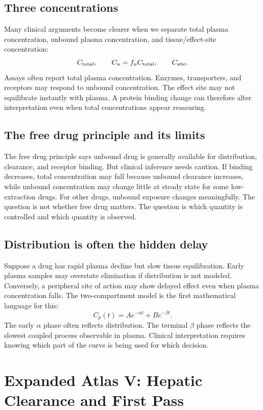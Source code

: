 \subsection{Three concentrations}

Many clinical arguments become clearer when we separate total plasma concentration, unbound plasma concentration, and tissue/effect-site concentration:
\[
  C_{\mathrm{total}},
  \qquad
  C_u=f_uC_{\mathrm{total}},
  \qquad
  C_{\mathrm{site}}.
\]
Assays often report total plasma concentration. Enzymes, transporters, and receptors may respond to unbound concentration. The effect site may not equilibrate instantly with plasma. A protein binding change can therefore alter interpretation even when total concentrations appear reassuring.

\subsection{The free drug principle and its limits}

The free drug principle says unbound drug is generally available for distribution, clearance, and receptor binding. But clinical inference needs caution. If binding decreases, total concentration may fall because unbound clearance increases, while unbound concentration may change little at steady state for some low-extraction drugs. For other drugs, unbound exposure changes meaningfully. The question is not whether free drug matters. The question is which quantity is controlled and which quantity is observed.

\subsection{Distribution is often the hidden delay}

Suppose a drug has rapid plasma decline but slow tissue equilibration. Early plasma samples may overstate elimination if distribution is not modeled. Conversely, a peripheral site of action may show delayed effect even when plasma concentration falls. The two-compartment model is the first mathematical language for this:
\[
  C_p(t)=Ae^{-\alpha t}+Be^{-\beta t}.
\]
The early \(\alpha\) phase often reflects distribution. The terminal \(\beta\) phase reflects the slowest coupled process observable in plasma. Clinical interpretation requires knowing which part of the curve is being used for which decision.

\section{Expanded Atlas V: Hepatic Clearance and First Pass}

